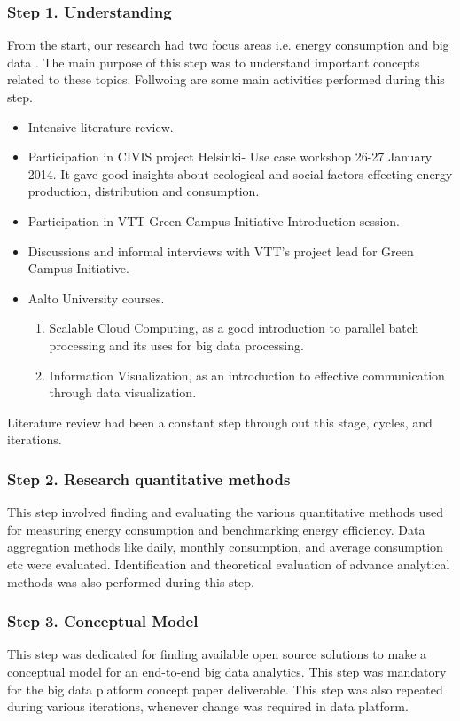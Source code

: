 \subsubsection{Step 1. Understanding} 
From the start, our research had two focus areas i.e. energy consumption and big data . The main purpose of this step was to understand important concepts related to these topics. Follwoing are some main activities performed during this step.
\begin{itemize}
\item Intensive literature review.
\item Participation in CIVIS project Helsinki- Use case workshop 26-27 January 2014. It gave good insights about ecological and social factors effecting energy production, distribution and consumption.
\item Participation in VTT Green Campus Initiative Introduction session.
\item Discussions and informal interviews with VTT's project lead for Green Campus Initiative.
\item Aalto University courses.
	\begin{enumerate}
	    \item Scalable Cloud Computing, as a good introduction to parallel batch processing and its uses for big data processing.
	    \item Information Visualization, as an introduction to effective communication through data visualization.
	  \end{enumerate}      
\end{itemize}

Literature review had been a constant step through out this stage, cycles, and iterations.
\subsubsection{Step 2. Research quantitative methods} \label{qm}
This step involved finding and evaluating the various quantitative methods used for measuring energy consumption and benchmarking energy efficiency. Data aggregation methods like daily, monthly consumption, and average consumption etc were evaluated. Identification and theoretical evaluation of advance analytical methods was also performed during this step.
\subsubsection{Step 3. Conceptual Model}\label{cmodel}
This step was dedicated for finding available open source solutions to make a conceptual model for an end-to-end big data analytics. This step was mandatory for the big data platform concept paper deliverable. This step was also repeated during various iterations, whenever change was required in data platform.
